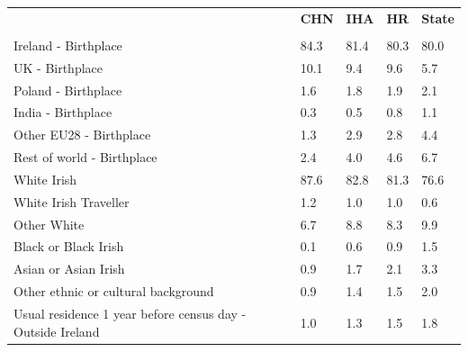 \documentclass{article}
\begin{document}
\pagebreak
\begin{table}[h]	
\centering
		\begin{tabular}{KTTTT}
  \hline
& \textbf{CHN} & \textbf{IHA} & \textbf{HR}& \textbf{State}\\ 
  \hline
    \\ 
    \hline
Ireland - Birthplace & 84.3& 81.4& 80.3& 80.0\\
UK - Birthplace & 10.1&  9.4&  9.6&  5.7\\
Poland - Birthplace & 1.6& 1.8& 1.9& 2.1\\
India - Birthplace & 0.3& 0.5& 0.8& 1.1\\
Other EU28 - Birthplace & 1.3& 2.9& 2.8& 4.4\\
Rest of world - Birthplace & 2.4& 4.0& 4.6& 6.7\\
    \hline
White Irish & 87.6& 82.8& 81.3& 76.6\\
White Irish Traveller & 1.2& 1.0& 1.0& 0.6\\
Other White & 6.7& 8.8& 8.3& 9.9\\
Black or Black Irish & 0.1& 0.6& 0.9& 1.5\\
Asian or Asian Irish & 0.9& 1.7& 2.1& 3.3\\
Other ethnic or cultural background & 0.9& 1.4& 1.5& 2.0\\
    \hline
Usual residence 1 year before census day - Outside Ireland & 1.0& 1.3& 1.5& 1.8\\


\end{tabular}
\end{table}
\end{document}
